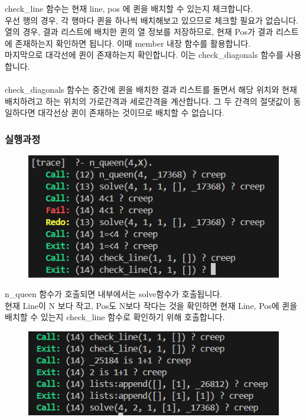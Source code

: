 \documentclass{article}
\begin{document}
check\_line 함수는 현재 line, pos 에 퀸을 배치할 수 있는지 체크합니다.\\
우선 행의 경우, 각 행마다 퀸을 하나씩 배치해보고 있으므로 체크할 필요가 없습니다.\\
열의 경우, 결과 리스트에 배치한 퀸의 열 정보를 저장하므로, 현재 Pos가 결과 리스트에 존재하는지 확인하면 됩니다. 이때 member 내장 함수를 활용합니다.\\
마지막으로 대각선에 퀸이 존재하는지 확인합니다. 이는 check\_diagonals 함수를 사용합니다.\\\\
check\_diagonals 함수는 중간에 퀸을 배치한 결과 리스트를 돌면서 해당 위치와 현재 배치하려고 하는 위치의 가로간격과 세로간격을 계산합니다. 그 두 간격의 절댓값이 동일하다면 대각선상 퀸이 존재하는 것이므로 배치할 수 없습니다.
\subsubsection{실행과정}
\begin{figure}[!htb]
    \centering
    \includegraphics[width=0.8\linewidth]{hw5b_2.png}
\end{figure}
n\_queen 함수가 호출되면 내부에서는 solve함수가 호출됩니다.\\
현재 Line이 N 보다 작고, Pos도 N보다 작다는 것을 확인하면 현재 Line, Pos에 퀸을 배치할 수 있는지 check\_line 함수로 확인하기 위해 호출합니다.\\
\begin{figure}[!htb]
    \centering
    \includegraphics[width=0.8\linewidth]{hw5b_3.png}
\end{figure}\\
\end{document}
